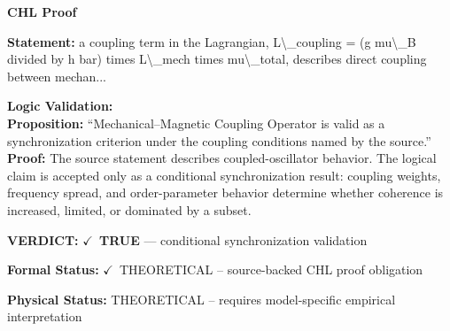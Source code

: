 \vspace{0.45em}
\noindent\textbf{CHL Proof}\par
\textbf{Statement:} a coupling term in the Lagrangian, L\textbackslash{}\_coupling = (g mu\textbackslash{}\_B divided by h bar) times
L\textbackslash{}\_mech times mu\textbackslash{}\_total, describes direct coupling between mechan...

\textbf{Logic Validation:}\\
\textbf{Proposition:} ``Mechanical--Magnetic Coupling Operator is valid as a synchronization criterion under the
coupling conditions named by the source.''\\
\textbf{Proof:} The source statement describes coupled-oscillator behavior. The logical claim is
accepted only as a conditional synchronization result: coupling weights, frequency
spread, and order-parameter behavior determine whether coherence is increased, limited,
or dominated by a subset.

\textbf{VERDICT:} \ensuremath{\checkmark}\ \textbf{TRUE} --- conditional synchronization validation

\textbf{Formal Status:} \ensuremath{\checkmark}\ THEORETICAL -- source-backed CHL proof obligation

\textbf{Physical Status:} THEORETICAL -- requires model-specific empirical interpretation
\par\vspace{0.45em}
\par
\ifTZPDarkEdition
{}
\fi
\endgroup
\endgroup

